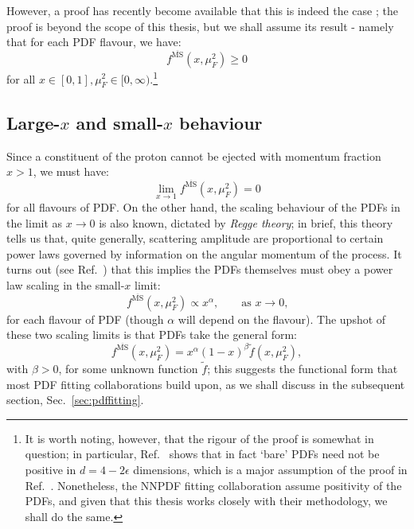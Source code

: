 \documentclass[withindex,glossary]{cam-thesis}
\begin{document}
However, a proof has recently become available that this is indeed the case \cite{Candido:2020yat}; the proof is beyond the scope of this thesis, but we shall assume its result - namely that for each PDF flavour, we have:
\begin{equation}
f^{\overline{\text{MS}}}(x,\mu_F^2) \geq 0
\end{equation}
for all $x \in [0,1], \mu_F^2 \in [0,\infty)$.\footnote{It is worth noting, however, that the rigour of the proof is somewhat in question; in particular, Ref.~\cite{Collins:2021vke} shows that in fact `bare' PDFs need not be positive in $d = 4 - 2\epsilon$ dimensions, which is a major assumption of the proof in Ref.~\cite{Candido:2020yat}. Nonetheless, the NNPDF fitting collaboration assume positivity of the PDFs, and given that this thesis works closely with their methodology, we shall do the same.}

\subsection{Large-$x$ and small-$x$ behaviour}
\label{sec:pdf_scaling}
Since a constituent of the proton cannot be ejected with momentum fraction $x > 1$, we must have:
\begin{equation}
\lim_{x \rightarrow 1} f^{\overline{\text{MS}}}(x, \mu_F^2) = 0
\end{equation}
for all flavours of PDF. On the other hand, the scaling behaviour of the PDFs in the limit as $x \rightarrow 0$ is also known, dictated by \textit{Regge theory}; in brief, this theory tells us that, quite generally, scattering amplitude are proportional to certain power laws governed by information on the angular momentum of the process. It turns out (see Ref.~\cite{Abarbanel:1969eh}) that this implies the PDFs themselves must obey a power law scaling in the small-$x$ limit:
\begin{equation}
f^{\overline{\text{MS}}}(x,\mu_F^2) \propto x^{\alpha}, \qquad \text{as $x \rightarrow 0$,}
\end{equation}
for each flavour of PDF (though $\alpha$ will depend on the flavour). The upshot of these two scaling limits is that PDFs take the general form:
\begin{equation}
f^{\overline{\text{MS}}}(x,\mu_F^2) = x^{\alpha} (1-x)^{\beta} \tilde{f}(x,\mu_F^2),
\end{equation}
with $\beta > 0$, for some unknown function $\tilde{f}$; this suggests the functional form that most PDF fitting collaborations build upon, as we shall discuss in the subsequent section, Sec.~\ref{sec:pdffitting}.
\end{document}
